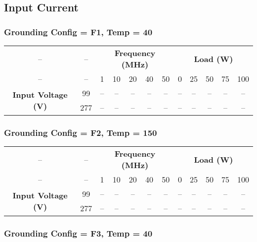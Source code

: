 \newpage
\subsection{Input Current}

\subsubsection{Grounding Config = F1, Temp = 40}

\begin{center}
\begin{tabular}{cccccccccccc}
-- & -- & \multicolumn{5}{c}{\textbf{Frequency (MHz)}} & \multicolumn{5}{c}{\textbf{Load (W)}} \\
-- & -- & 1 & 10 & 20 & 40 & 50 & 0 & 25 & 50 & 75 & 100 \\
\midrule
\multirow{2}{*}{\textbf{Input Voltage (V)}} & 99 & -- & -- & -- & -- & -- & -- & -- & -- & -- & -- \\
 & 277 & -- & -- & -- & -- & -- & -- & -- & -- & -- & -- \\
\end{tabular}
\end{center}

\vspace{1em}

\subsubsection{Grounding Config = F2, Temp = 150}

\begin{center}
\begin{tabular}{cccccccccccc}
-- & -- & \multicolumn{5}{c}{\textbf{Frequency (MHz)}} & \multicolumn{5}{c}{\textbf{Load (W)}} \\
-- & -- & 1 & 10 & 20 & 40 & 50 & 0 & 25 & 50 & 75 & 100 \\
\midrule
\multirow{2}{*}{\textbf{Input Voltage (V)}} & 99 & -- & -- & -- & -- & -- & -- & -- & -- & -- & -- \\
 & 277 & -- & -- & -- & -- & -- & -- & -- & -- & -- & -- \\
\end{tabular}
\end{center}

\vspace{1em}

\subsubsection{Grounding Config = F3, Temp = 40}

